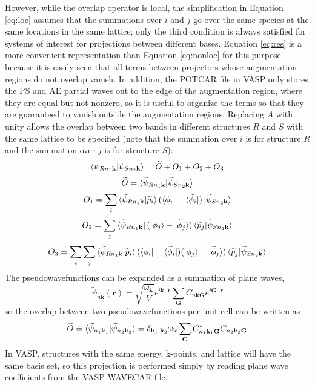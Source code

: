 \documentclass[12pt]{article}
\begin{document}
However, while the overlap operator is local, the simplification in Equation \ref{eq:loc} assumes that
the summations over $i$ and $j$ go over the same species at the same locations in the same lattice;
only the third condition is always satisfied for systems of interest for projections between different
bases. Equation \ref{eq:res} is a more convenient representation than Equation \ref{eq:nonloc} for this
purpose because it is easily seen that all terms between projectors whose augmentation regions do not
overlap vanish. In addition, the POTCAR file in VASP only stores the PS and AE partial waves out to the
edge of the augmentation region, where they are equal but not nonzero, so it is useful to organize the terms
so that they are guaranteed to vanish outside the augmentation regions. Replacing $A$ with unity
allows the overlap between two bands
in different structures $R$ and $S$ with the same lattice to be specified (note that the
summation over $i$ is for structure $R$ and the summation over $j$ is for structure $S$):
\begin{equation}
\braket{\psi_{Rn_1\mathbf{k}}|\psi_{Sn_2\mathbf{k}}}=\widetilde{O}+O_1+O_2+O_3
\label{eq:ov1}
\end{equation}
$$\widetilde{O}=\braket{\widetilde{\psi}_{Rn_1\mathbf{k}}|\widetilde{\psi}_{Sn_2\mathbf{k}}}$$
$$O_1=\sum_i\braket{\widetilde{\psi}_{Rn_1\mathbf{k}}|\widetilde{p}_i}(\bra{\phi_i}-\bra{\widetilde{\phi}_i})
\ket{\widetilde{\psi}_{Sn_2\mathbf{k}}}$$
$$O_2=\sum_j\bra{\widetilde{\psi}_{Rn_1\mathbf{k}}}(\ket{\phi_j}-\ket{\widetilde{\phi}_j})
\braket{\widetilde{p}_j|\widetilde{\psi}_{Sn_2\mathbf{k}}}$$
$$O_3=\sum_i\sum_j\braket{\widetilde{\psi}_{Rn_1\mathbf{k}}|
\widetilde{p}_i}(\bra{\phi_i}-\bra{\widetilde{\phi}_i})
(\ket{\phi_j}-\ket{\widetilde{\phi}_j})\braket{\widetilde{p}_j|\widetilde{\psi}_{Sn_2\mathbf{k}}}$$
The pseudowavefunctions can be expanded as a summation of plane waves,
$$\widetilde{\psi}_{n\mathbf{k}}(\mathbf{r})=\sqrt{\frac{\omega_{\mathbf{k}}}{V}}
e^{i\mathbf{k}\cdot \mathbf{r}}\sum_{\mathbf{G}} C_{n\mathbf{k}\mathbf{G}}
e^{i\mathbf{G}\cdot \mathbf{r}}$$
so the overlap between two pseudowavefunctions per unit cell can be written as
$$\widetilde{O}=\braket{\widetilde{\psi}_{n_1\mathbf{k}_1}|\widetilde{\psi}_{n_2\mathbf{k}_2}}
=\delta_{\mathbf{k}_1,\mathbf{k}_2}
\omega_{\mathbf{k}} \sum_{\mathbf{G}} C^*_{n_1\mathbf{k}_1\mathbf{G}}C_{n_2\mathbf{k}_2\mathbf{G}}$$
In VASP, structures with the same energy, k-points, and lattice will have the same basis set,
so this projection is performed simply by reading plane wave coefficients from the VASP WAVECAR file.
\end{document}
